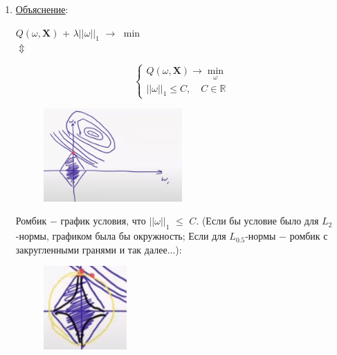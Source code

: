                     \begin{enumerate}
                        \item \underline{Объяснение}:
                        \begin{center}
                            $Q(\omega, \mathbf{X})$ + $\lambda||\omega||_1$ $\longrightarrow$ $\min$\\
                            \Large{$\Updownarrow$}
                            
                            \begin{equation*}
                            
                             \begin{cases}
                               Q(\omega, \mathbf{X}) \longrightarrow \min\limits_\omega\\
                               ||\omega||_1 \leq C, \quad C \in \mathbb{R}
                             \end{cases}
                            \end{equation*}
                            
                        \end{center}

                        \begin{figure}[H]
                            \centering
                            \includegraphics[width=0.5\textwidth]{images/4lecture/Explonation1.png}

                        \end{figure}
                        Ромбик $-$ график условия, что $||\omega||_1$ $\leq$ $C$. (Если бы условие было для $L_2$-нормы, графиком была бы окружность; Если для $L_{0.5}$-нормы $-$ ромбик с закругленными гранями и так далее...):
                        \begin{figure}[H]
                            \centering
                            \includegraphics[width=0.3\textwidth]{images/4lecture/L_norm_plots.png}


\end{figure}
\end{enumerate}
